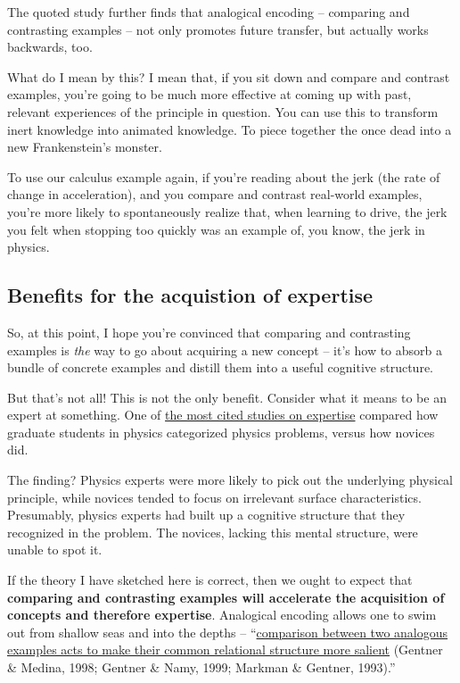The quoted study further finds that analogical encoding -- comparing and
contrasting examples -- not only promotes future transfer, but actually
works backwards, too.

What do I mean by this? I mean that, if you sit down and compare and
contrast examples, you're going to be much more effective at coming up
with past, relevant experiences of the principle in question. You can
use this to transform inert knowledge into animated knowledge. To piece
together the once dead into a new Frankenstein's monster.

To use our calculus example again, if you're reading about the jerk (the
rate of change in acceleration), and you compare and contrast real-world
examples, you're more likely to spontaneously realize that, when
learning to drive, the jerk you felt when stopping too quickly was an
example of, you know, the jerk in physics.

\subsection{Benefits for the acquistion of
expertise}\label{benefits-for-the-acquistion-of-expertise}

So, at this point, I hope you're convinced that comparing and
contrasting examples is \emph{the} way to go about acquiring a new
concept -- it's how to absorb a bundle of concrete examples and distill
them into a useful cognitive structure.

But that's not all! This is not the only benefit. Consider what it means
to be an expert at something. One of
\href{http://eric.ed.gov/?id=ED215899}{the most cited studies on
expertise} compared how graduate students in physics categorized physics
problems, versus how novices did.

The finding? Physics experts were more likely to pick out the underlying
physical principle, while novices tended to focus on irrelevant surface
characteristics. Presumably, physics experts had built up a cognitive
structure that they recognized in the problem. The novices, lacking this
mental structure, were unable to spot it.

If the theory I have sketched here is correct, then we ought to expect
that \textbf{comparing and contrasting examples will accelerate the
acquisition of concepts and therefore expertise}. Analogical encoding
allows one to swim out from shallow seas and into the depths --
``\href{http://onlinelibrary.wiley.com/doi/10.1111/j.1551-6709.2009.01070.x/full}{comparison
between two analogous examples acts to make their common relational
structure more salient} (Gentner \& Medina, 1998; Gentner \& Namy, 1999;
Markman \& Gentner, 1993).''

